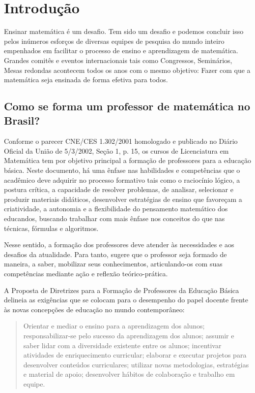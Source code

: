 \documentclass[12pt]{article}
\begin{document}
\section{Introdução}

Ensinar matemática é um desafio. Tem sido um desafio e podemos concluir isso pelos inúmeros esforços de diversas equipes de pesquisa do mundo inteiro empenhados em facilitar o processo de ensino e aprendizagem de matemática. Grandes comitês e eventos internacionais tais como Congressos, Seminários, Mesas redondas acontecem todos os anos com o mesmo objetivo: Fazer com que a matemática seja ensinada de forma efetiva para todos.


\subsection{Como se forma um professor de matemática no Brasil?}
Conforme o parecer CNE/CES 1.302/2001 homologado e publicado no Diário Oficial da União de 5/3/2002, Seção 1, p. 15, os cursos de Licenciatura em Matemática tem por objetivo principal a formação de professores para a educação básica. Neste documento, há uma ênfase nas habilidades e competências que o acadêmico deve adquirir no processo formativo tais como o raciocínio lógico, a postura crítica, a capacidade de resolver problemas, de analisar, selecionar e produzir materiais didáticos, desenvolver estratégias de ensino que favoreçam a criatividade, a autonomia e a flexibilidade do pensamento matemático dos educandos, buscando trabalhar com mais ênfase nos conceitos do que nas técnicas, fórmulas e algoritmos. \cite{leite2009formaccao}

\noindent
Nesse sentido, a formação dos professores deve atender às necessidades e aos desafios da atualidade. Para tanto, \cite{pletsch2009formaccao} sugere que o professor seja formado de maneira, a saber, mobilizar seus conhecimentos, articulando-os com suas competências mediante ação e reflexão teórico-prática. 

\noindent
A Proposta de Diretrizes para a Formação de Professores da Educação Básica delineia as exigências que se colocam para o desempenho do papel docente frente às novas concepções de educação no mundo contemporâneo:

\begin{quote}
    Orientar e mediar o ensino para a aprendizagem dos alunos; responsabilizar-se pelo sucesso da aprendizagem dos alunos; assumir e saber lidar com a diversidade existente entre os alunos; incentivar atividades de enriquecimento curricular; elaborar e executar projetos para desenvolver conteúdos curriculares; utilizar novas metodologias, estratégias e material de apoio; desenvolver hábitos de colaboração e trabalho em equipe. \cite{mec2000}
\end{quote}
\end{document}
